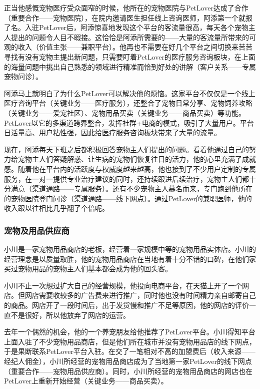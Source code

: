 \documentclass[a4paper]{ctexart}
\begin{document}
正当他感慨宠物医疗受众面窄的时候，他所在的宠物医院与PetLover达成了合作（重要合作——宠物医院），在院内邀请医生担任线上咨询医师，阿添第一个就报了名。入驻PetLover后，阿添惊喜地发现这个平台的客流量很高，每天各个宠物主人提出的问题令人目不暇接。这恰恰是阿添所需要的——大量的客流量所带来的可观的收入（价值主张——兼职平台）。他再也不需要在好几个平台之间切换来苦苦寻找有没有宠物主提出新问题，只需要盯着PetLover的医疗服务咨询板块，在上面的海量问题中挑出自己熟悉的领域进行精准而恰到好处的讲解（客户关系——专属宠物问诊）。

阿添马上就明白了为什么PetLover可以解决他的烦恼。这家平台不仅仅是一个线上医疗咨询平台（关键业务——医疗服务），还整合了宠物日常分享、宠物饲养攻略（关键业务——爱宠社区）、宠物用品买卖（关键业务——商品买卖）等功能。PetLover以它的多渠道跨界整合，发挥社群+电商的模式，吸引了大量用户。平台日活量高、用户粘性强，因此给医疗服务咨询板块带来了大量的流量。

现在，阿添每天下班之后都积极回答宠物主人们提出的问题。看着他通过自己的努力给宠物主人们答疑解惑、让生病的宠物们恢复往日的活力，他的心里充满了成就感。随着他在平台内的活跃度与权威度越来越高，他也接到了不少用户定制的专属服务，在一对一提供专业治疗建议的同时，还持续跟进后续治疗，宠物主人们都十分满意（渠道通路——专属服务）。还有不少宠物主人慕名而来，专门跑到他所在的宠物医院登门问诊（渠道通路——线下网点）。通过PetLover的兼职医师，他的收入跟以往相比几乎翻了个倍呢。

\subsubsection{宠物及用品供应商}

小川是一家宠物用品商店的老板，经营着一家规模中等的宠物用品实体店。小川的经营理念是以质量取胜，他的宠物用品商店在当地有着十分不错的口碑，在他们家买过宠物用品的宠物主人们基本都会成为他的回头客。

小川不止一次想过扩大自己的经营规模，他投向电商平台，在天猫上开了一个网店。但网店需要收较多的广告费来进行推广，同时他也没有时间精力亲自邮寄自己的商品。网店开了一段时间后，出于发货慢和推广不足等原因，他的网店的评价一直不是很好，所以他放弃了网店的运营。

去年一个偶然的机会，他的一个养宠朋友给他推荐了PetLover平台。小川得知平台上面入驻了不少宠物用品商店，但是他们所在城市并没有宠物用品店的线下网点，于是果断联系PetLover平台入驻。在交了一笔相对不高的加盟费后（收入来源——经纪人佣金），小川所经营的宠物用品商店成为了当地第一家PetLover的线下网点（重要合作——宠物用品供应商）。同时，小川所经营的宠物用品商店的网店也在PetLover上重新开始经营（关键业务——商品买卖）。
\end{document}
